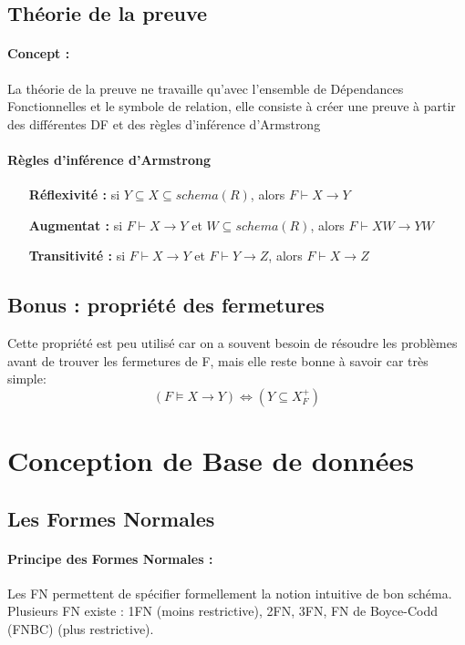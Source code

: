 \documentclass[10pt,a4paper]{article}
\begin{document}
\subsection{Théorie de la preuve}
\paragraph{Concept :} La théorie de la preuve ne travaille qu'avec l'ensemble de Dépendances Fonctionnelles et le symbole de relation, elle consiste à créer une preuve à partir des différentes DF et des règles d'inférence d'Armstrong

\paragraph{Règles d'inférence d'Armstrong}
\begin{itemize}
\item[\textbf{Réflexivité :}] si $Y \subseteq X \subseteq schema(R) $, alors $F \vdash X \rightarrow Y$
\item[\textbf{Augmentat\up{o} :}] si $F \vdash X \rightarrow Y$ et $W \subseteq schema(R)$, alors $F \vdash XW \rightarrow YW$
\item[\textbf{Transitivité :}] si $F \vdash X \rightarrow Y$ et $F \vdash Y \rightarrow Z$, alors $F \vdash X \rightarrow Z$
\end{itemize}

\subsection*{Bonus : propriété des fermetures}
Cette propriété est peu utilisé car on a souvent besoin de résoudre les problèmes avant de trouver les fermetures de F, mais elle reste bonne à savoir car très simple:
$$(F \models X \rightarrow Y) \Leftrightarrow (Y \subseteq X_{F}^{+})$$

\section{Conception de Base de données}
\subsection{Les Formes Normales}

\paragraph{Principe des Formes Normales :} Les FN permettent de spécifier formellement la notion intuitive de bon schéma. Plusieurs FN existe : 1FN (moins restrictive), 2FN, 3FN, FN de Boyce-Codd (FNBC) (plus restrictive).
\end{document}
